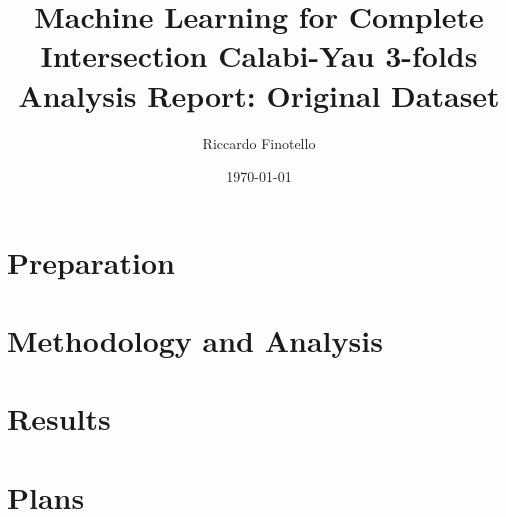 \documentclass[10pt,a4paper]{article}
\author{Riccardo Finotello}
\title{
    Machine Learning for Complete Intersection Calabi-Yau 3-folds
    \\[0.3cm]
    \Large{\textbf{Analysis Report: Original Dataset}}
}
\date{\today}
\numberwithin{equation}{section}
\numberwithin{figure}{section}
\numberwithin{table}{section}
\begin{document}
    \maketitle
    
    \begin{abstract}
        
    \end{abstract}
    
    \tableofcontents
    
    \section{Preparation}
        
    
    \section{Methodology and Analysis}
        
    
    \section{Results}
        
    
    \section{Plans}
    
    
    
\end{document}
